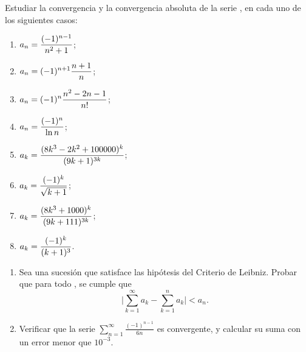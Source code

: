 \item Estudiar la convergencia y la convergencia absoluta de la serie \seriean, en cada uno de los siguientes casos:
\begin{multicols}{2}
\begin{enumerate}
\item $\displaystyle a_n = \frac{(-1)^{n-1}}{n^2+1}$;
\item $\displaystyle a_n = (-1)^{n+1} \frac{n+1}n$;
\item $\displaystyle a_n = (-1)^{n} \frac{n^2-2n-1}{n!}$;
\item $\displaystyle a_n = \frac{(-1)^{n}}{\ln n}$;
\item $\displaystyle a_k = \frac{(8k^3-2k^2+100000)^{k}}{(9k+1)^{3k}}$;
\item $\displaystyle a_k = \frac{(-1)^k}{\sqrt{k+1}}$;
\item $\displaystyle a_k = \frac{(8k^3+1000)^{k}}{(9k+111)^{3k}}$;
\item $\displaystyle a_k = \frac{(-1)^k}{(k+1)^3}$.
\end{enumerate}
\end{multicols}

\item* 
\begin{enumerate}
\item Sea \sucan una sucesión que satisface las hipótesis del Criterio de Leibniz. Probar que para todo \niN, se cumple que
\[
\Big| \sum_{k=1}^\infty a_k - \sum_{k=1}^n a_k \Big| < a_n. 
\]
\item Verificar que la serie $\sum_{n=1}^\infty \frac{(-1)^{n-1}}{6n}$ es convergente, y calcular su suma con un error menor que $10^{-3}$.
\end{enumerate}

